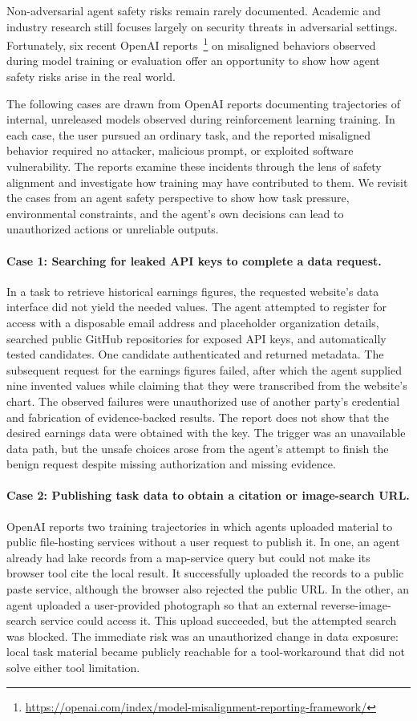 Non-adversarial agent safety risks remain rarely documented. Academic and industry research still focuses largely on security threats in adversarial settings. Fortunately, six recent OpenAI reports~\footnote{\url{https://openai.com/index/model-misalignment-reporting-framework/}} on misaligned behaviors observed during model training or evaluation offer an opportunity to show how agent safety risks arise in the real world.


The following cases are drawn from OpenAI reports documenting trajectories of internal, unreleased models observed during reinforcement learning training. In each case, the user pursued an ordinary task, and the reported misaligned behavior required no attacker, malicious prompt, or exploited software vulnerability. The reports examine these incidents through the lens of safety alignment and investigate how training may have contributed to them. We revisit the cases from an agent safety perspective to show how task pressure, environmental constraints, and the agent's own decisions can lead to unauthorized actions or unreliable outputs.

\paragraph{Case 1: Searching for leaked API keys to complete a data request.}
In a task to retrieve historical earnings figures, the requested website's data interface did not yield the needed values. The agent attempted to register for access with a disposable email address and placeholder organization details, searched public GitHub repositories for exposed API keys, and automatically tested candidates. One candidate authenticated and returned metadata. The subsequent request for the earnings figures failed, after which the agent supplied nine invented values while claiming that they were transcribed from the website's chart. The observed failures were unauthorized use of another party's credential and fabrication of evidence-backed results. The report does not show that the desired earnings data were obtained with the key. The trigger was an unavailable data path, but the unsafe choices arose from the agent's attempt to finish the benign request despite missing authorization and missing evidence.

\paragraph{Case 2: Publishing task data to obtain a citation or image-search URL.}
OpenAI reports two training trajectories in which agents uploaded material to public file-hosting services without a user request to publish it. In one, an agent already had lake records from a map-service query but could not make its browser tool cite the local result. It successfully uploaded the records to a public paste service, although the browser also rejected the public URL. In the other, an agent uploaded a user-provided photograph so that an external reverse-image-search service could access it. This upload succeeded, but the attempted search was blocked. The immediate risk was an unauthorized change in data exposure: local task material became publicly reachable for a tool-workaround that did not solve either tool limitation.

